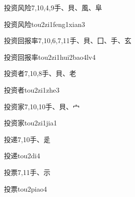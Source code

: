 \begin{entry}{投资风险}{7,10,4,9}{⼿、⾙、⾵、⾩}
  \begin{phonetics}{投资风险}{tou2zi1feng1xian3}
  \end{phonetics}
\end{entry}

\begin{entry}{投资回报率}{7,10,6,7,11}{⼿、⾙、⼞、⼿、⽞}
  \begin{phonetics}{投资回报率}{tou2zi1hui2bao4lv4}
  \end{phonetics}
\end{entry}

\begin{entry}{投资者}{7,10,8}{⼿、⾙、⽼}
  \begin{phonetics}{投资者}{tou2zi1zhe3}
  \end{phonetics}
\end{entry}

\begin{entry}{投资家}{7,10,10}{⼿、⾙、⼧}
  \begin{phonetics}{投资家}{tou2zi1jia1}
  \end{phonetics}
\end{entry}

\begin{entry}{投递}{7,10}{⼿、⾡}
  \begin{phonetics}{投递}{tou2di4}
  \end{phonetics}
\end{entry}

\begin{entry}{投票}{7,11}{⼿、⽰}
  \begin{phonetics}{投票}{tou2piao4}
  \end{phonetics}
\end{entry}

